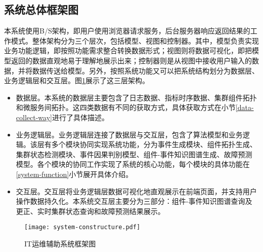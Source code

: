 \subsection{系统总体框架图}
本系统使用B/S架构，即用户使用浏览器请求服务，后台服务器响应返回结果的工作模式。整体架构分为三个层次，包括模型、视图和控制器。其中，模型负责实现业务功能逻辑，即按照功能需求整合转换数据形式；视图则将数据可视化，即把模型返回的数据直观地易于理解地展示出来；控制器则是从视图中接收用户输入的数据，并将数据传送给模型。另外，按照系统功能又可以把系统结构划分为数据层、业务逻辑层和交互层。图\ref{system-constructure}展示了这三层架构。
\begin{itemize}
    \item [（1）]数据层。本系统的数据层主要包含了日志数据、指标时序数据、集群组件拓扑和微服务间拓扑。这四类数据有不同的获取方式，具体获取方式在小节\ref{data-collect-way}进行了具体描述。
    \item [（2）]业务逻辑层。业务逻辑层连接了数据层与交互层，包含了算法模型和业务逻辑。该层有多个模块协同实现系统功能，分为事件生成模块、组件拓扑生成、集群状态检测模块、事件因果判别模型、组件-事件知识图谱生成、故障预测模型。各个模块的协同工作实现了系统的核心功能，每个模块的具体功能在\ref{system-function}小节展开具体介绍。
    \item [（3）]交互层。交互层将业务逻辑层数据可视化地直观展示在前端页面，并支持用户操作数据持久化。本系统交互层主要分为三部分：组件-事件知识图谱查询及更正、实时集群状态查询和故障预测结果展示。
\end{itemize}

\begin{figure}[htbp]
    \centering
    \texttt{[image: system-constructure.pdf]}
    \caption{IT运维辅助系统框架图\label{system-constructure}}
\end{figure}

